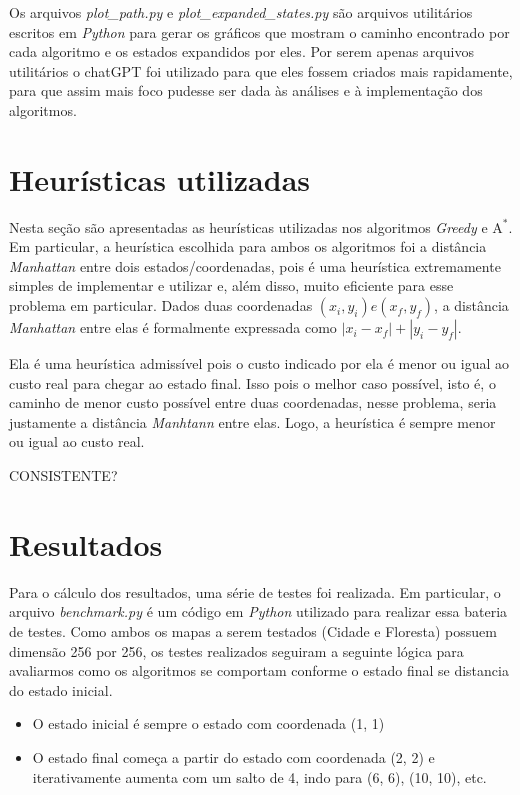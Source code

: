 \documentclass{article}
\begin{document}
Os arquivos \textit{plot\_path.py} e \textit{plot\_expanded\_states.py} são arquivos utilitários escritos em \textit{Python} para gerar os gráficos que mostram o caminho encontrado por cada algoritmo
e os estados expandidos por eles. Por serem apenas arquivos utilitários o chatGPT foi utilizado para que eles fossem criados mais rapidamente, para que assim mais foco pudesse ser dada às análises e à implementação dos algoritmos.

\section{Heurísticas utilizadas}

Nesta seção são apresentadas as heurísticas utilizadas nos algoritmos \textit{Greedy} e \(\text{A}^*\). Em particular, a heurística escolhida para ambos os algoritmos
foi a distância \textit{Manhattan} entre dois estados/coordenadas, pois é uma heurística extremamente simples de implementar e utilizar e, além disso, muito eficiente para esse problema em particular.
Dados duas coordenadas \((x_i, y_i) e (x_f, y_f)\), a distância \textit{Manhattan} entre elas é formalmente expressada como \(|x_i - x_f| + |y_i - y_f|\).

Ela é uma heurística admissível pois o custo indicado por ela é menor ou igual ao custo real para chegar ao estado final. Isso pois o melhor caso possível, isto é, o caminho de menor custo possível
entre duas coordenadas, nesse problema, seria justamente a distância \textit{Manhtann} entre elas. Logo, a heurística é sempre menor ou igual ao custo real.

CONSISTENTE?

\section{Resultados}

Para o cálculo dos resultados, uma série de testes foi realizada. Em particular, o arquivo \textit{benchmark.py} é um código em \textit{Python} utilizado para realizar essa bateria de testes.
Como ambos os mapas a serem testados (Cidade e Floresta) possuem dimensão 256 por 256, os testes realizados seguiram a seguinte lógica para avaliarmos como os algoritmos se comportam conforme o estado final
se distancia do estado inicial.

\begin{itemize}
	\item O estado inicial é sempre o estado com coordenada (1, 1)
	\item O estado final começa a partir do estado com coordenada (2, 2) e iterativamente aumenta com um salto de 4, indo para
	      (6, 6), (10, 10), etc.
\end{itemize}
\end{document}
